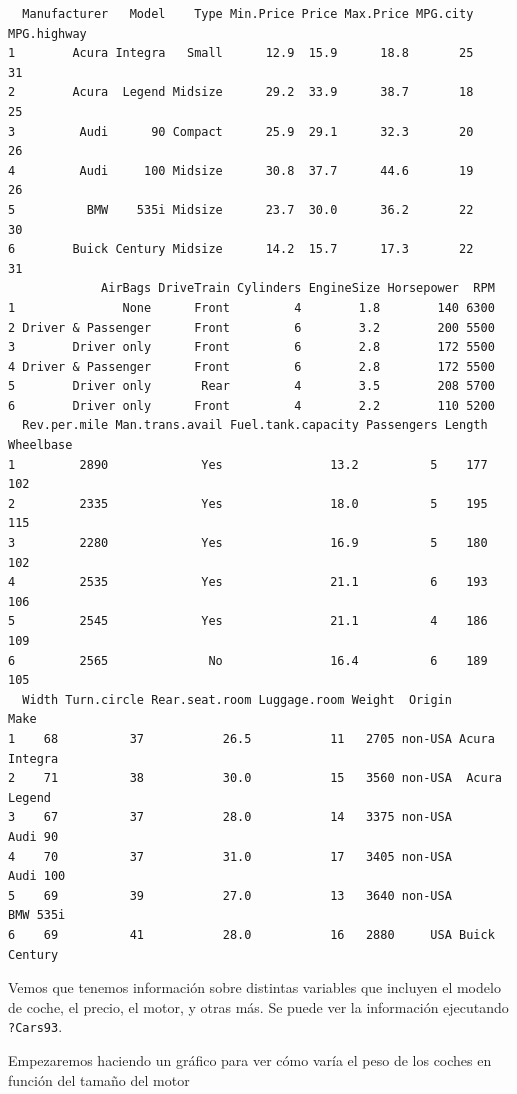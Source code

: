 \documentclass[
]{book}
\begin{document}
\begin{verbatim}
  Manufacturer   Model    Type Min.Price Price Max.Price MPG.city MPG.highway
1        Acura Integra   Small      12.9  15.9      18.8       25          31
2        Acura  Legend Midsize      29.2  33.9      38.7       18          25
3         Audi      90 Compact      25.9  29.1      32.3       20          26
4         Audi     100 Midsize      30.8  37.7      44.6       19          26
5          BMW    535i Midsize      23.7  30.0      36.2       22          30
6        Buick Century Midsize      14.2  15.7      17.3       22          31
             AirBags DriveTrain Cylinders EngineSize Horsepower  RPM
1               None      Front         4        1.8        140 6300
2 Driver & Passenger      Front         6        3.2        200 5500
3        Driver only      Front         6        2.8        172 5500
4 Driver & Passenger      Front         6        2.8        172 5500
5        Driver only       Rear         4        3.5        208 5700
6        Driver only      Front         4        2.2        110 5200
  Rev.per.mile Man.trans.avail Fuel.tank.capacity Passengers Length Wheelbase
1         2890             Yes               13.2          5    177       102
2         2335             Yes               18.0          5    195       115
3         2280             Yes               16.9          5    180       102
4         2535             Yes               21.1          6    193       106
5         2545             Yes               21.1          4    186       109
6         2565              No               16.4          6    189       105
  Width Turn.circle Rear.seat.room Luggage.room Weight  Origin          Make
1    68          37           26.5           11   2705 non-USA Acura Integra
2    71          38           30.0           15   3560 non-USA  Acura Legend
3    67          37           28.0           14   3375 non-USA       Audi 90
4    70          37           31.0           17   3405 non-USA      Audi 100
5    69          39           27.0           13   3640 non-USA      BMW 535i
6    69          41           28.0           16   2880     USA Buick Century
\end{verbatim}

Vemos que tenemos información sobre distintas variables que incluyen el modelo de coche, el precio, el motor, y otras más. Se puede ver la información ejecutando \texttt{?Cars93}.

Empezaremos haciendo un gráfico para ver cómo varía el peso de los coches en función del tamaño del motor
\end{document}
